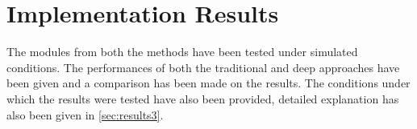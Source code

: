 \chapter{Implementation Results}
\label{sec:results}

The modules from both the methods have been tested  under simulated conditions. The performances of both the traditional and deep approaches have been given and a comparison has been made on the results. The conditions under which the results were tested have also been provided, detailed explanation has also been given in \ref{sec:results3}. 



